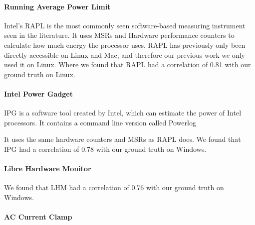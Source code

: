 \paragraph{Running Average Power Limit}
Intel's RAPL is the most commonly seen software-based measuring instrument seen in the literature. It uses MSRs and Hardware performance counters to calculate how much energy the processor uses. RAPL has previously only been directly accessible on Linux and Mac, and therefore our previous work we only used it on Linux. Where we found that RAPL had a correlation of 0.81 with our ground truth on Linux.\cite{biksbois}

\paragraph{Intel Power Gadget}
IPG is a software tool created by Intel, which can estimate the power of Intel processors. It contains a command line version called Powerlog

It uses the same hardware counters and MSRs as RAPL does. We found that IPG had a correlation of 0.78 with our ground truth on Windows.\cite{biksbois}




\paragraph{Libre Hardware Monitor}

We found that LHM had a correlation of 0.76 with our ground truth on Windows.\cite{biksbois}

\paragraph{AC Current Clamp}

